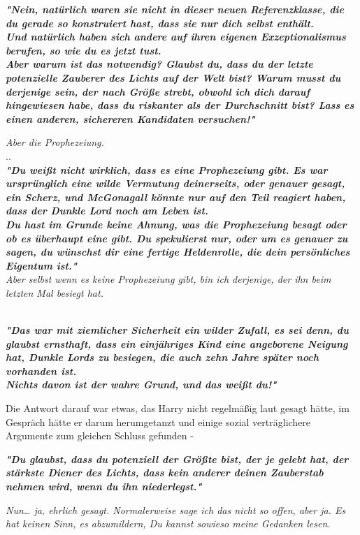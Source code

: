 {\textbf{\emph{"Nein, natürlich waren sie nicht in dieser neuen Referenzklasse, die du gerade so konstruiert hast, dass sie nur dich selbst enthält.\\ Und natürlich haben sich andere auf ihren eigenen Exzeptionalismus berufen, so wie du es jetzt tust.}}\\ \textbf{\emph{\hfill\break Aber warum ist das notwendig? Glaubst du, dass du der letzte potenzielle Zauberer des Lichts auf der Welt bist? Warum musst du derjenige sein, der nach Größe strebt, obwohl ich dich darauf hingewiesen habe, dass du riskanter als der Durchschnitt bist? Lass es einen anderen, sichereren Kandidaten versuchen!"}}

\emph{Aber die Prophezeiung.}\\ ..\\ \textbf{\emph{"Du weißt nicht wirklich, dass es eine Prophezeiung gibt. Es war ursprünglich eine wilde Vermutung deinerseits, oder genauer gesagt, ein Scherz, und McGonagall könnte nur auf den Teil reagiert haben, dass der Dunkle Lord noch am Leben ist.\\ Du hast im Grunde keine Ahnung, was die Prophezeiung besagt oder ob es überhaupt eine gibt. Du spekulierst nur, oder um es genauer zu sagen, du wünschst dir eine fertige Heldenrolle, die dein persönliches Eigentum ist."}}\\ \emph{\hfill\break Aber selbst wenn es keine Prophezeiung gibt, bin ich derjenige, der ihn beim letzten Mal besiegt hat.\\ }\strut \\ \textbf{\emph{"Das war mit ziemlicher Sicherheit ein wilder Zufall, es sei denn, du glaubst ernsthaft, dass ein einjähriges Kind eine angeborene Neigung hat, Dunkle Lords zu besiegen, die auch zehn Jahre später noch vorhanden ist.\\ }} \textbf{\emph{Nichts davon ist der wahre Grund, und das weißt du!"}}

Die Antwort darauf war etwas, das Harry nicht regelmäßig laut gesagt hätte, im Gespräch hätte er darum herumgetanzt und einige sozial verträglichere Argumente zum gleichen Schluss gefunden -

\textbf{\emph{"Du glaubst, dass du potenziell der Größte bist, der je gelebt hat, der stärkste Diener des Lichts, dass kein anderer deinen Zauberstab nehmen wird, wenn du ihn niederlegst."}}

\emph{Nun… ja, ehrlich gesagt. Normalerweise sage ich das nicht so offen, aber ja. Es hat keinen Sinn, es abzumildern, Du kannst sowieso meine Gedanken lesen.}

}
